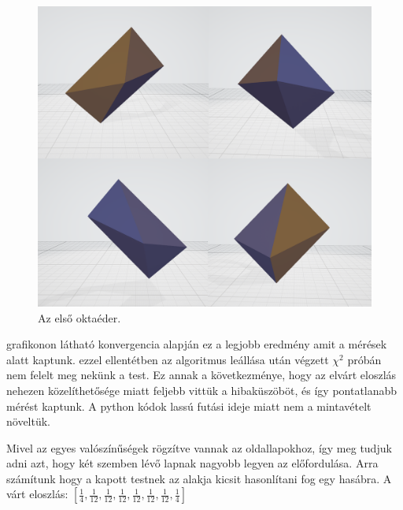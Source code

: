 \begin{figure}[h!]
	\centering
	\includegraphics[width=\textwidth]{images/octa01obj.png}
	\caption{Az első oktaéder.}
	\label{fig:octa01obj}
\end{figure}

 grafikonon látható konvergencia alapján ez a legjobb eredmény amit a mérések alatt kaptunk.
ezzel ellentétben az algoritmus leállása után végzett $\chi^2$ próbán nem felelt meg nekünk a test.
Ez annak a következménye, hogy az elvárt eloszlás nehezen közelíthetősége miatt feljebb vittük a hibaküszöböt, és így pontatlanabb mérést kaptunk.
A python kódok lassú futási ideje miatt nem a mintavételt növeltük.

Mivel az egyes valószínűségek rögzítve vannak az oldallapokhoz, így meg tudjuk adni azt, hogy két szemben lévő lapnak nagyobb legyen az előfordulása.
Arra számítunk hogy a kapott testnek az alakja kicsit hasonlítani fog egy hasábra.
A várt eloszlás: $[\frac{1}{4}, \frac{1}{12}, \frac{1}{12}, \frac{1}{12}, \frac{1}{12}, \frac{1}{12}, \frac{1}{12}, \frac{1}{4}]$

